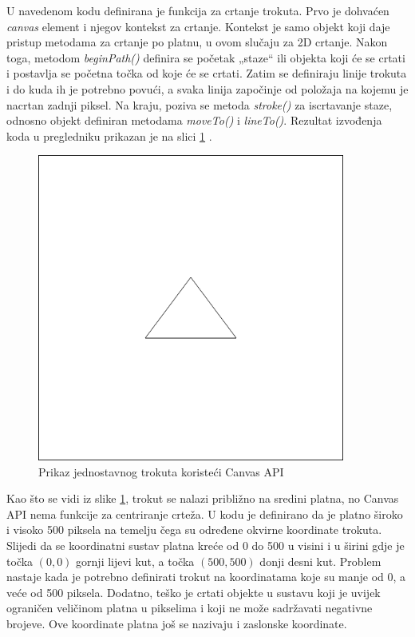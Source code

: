 \documentclass{foi}
\begin{document}
U navedenom kodu definirana je funkcija za crtanje trokuta. Prvo je dohvaćen \textit{canvas} element i njegov kontekst za crtanje. Kontekst je samo objekt koji daje pristup metodama za crtanje po platnu, u ovom slučaju za 2D crtanje. Nakon toga, metodom \textit{beginPath()} definira se početak „staze“ ili objekta koji će se crtati i postavlja se početna točka od koje će se crtati. Zatim se definiraju linije trokuta i do kuda ih je potrebno povući, a svaka linija započinje od položaja na kojemu je nacrtan zadnji piksel. Na kraju, poziva se metoda \textit{stroke()} za iscrtavanje staze, odnosno objekt definiran metodama \textit{moveTo()} i \textit{lineTo()}. Rezultat izvođenja koda u pregledniku prikazan je na slici \ref{fig:OsnovniCanvasTrokut} \parencite{MozzilaDevCanvasAPI}. 
\\
\begin{figure}[H]
    \centering
    \includegraphics[width=0.9\textwidth]{slike/1_OsnovniCanvasTrokut.png}
    \captionsetup{justification=centering}
    \caption{Prikaz jednostavnog trokuta koristeći Canvas API}
\label{fig:OsnovniCanvasTrokut}
\end{figure}

Kao što se vidi iz slike \ref{fig:OsnovniCanvasTrokut}, trokut se nalazi približno na sredini platna, no Canvas API nema funkcije za centriranje crteža. U kodu je definirano da je platno široko i visoko 500 piksela na temelju čega su određene okvirne koordinate trokuta. Slijedi da se koordinatni sustav platna kreće od 0 do 500 u visini i u širini gdje je točka $(0,0)$ gornji lijevi kut, a točka $(500,500)$ donji desni kut. Problem nastaje kada je potrebno definirati trokut na koordinatama koje su manje od 0, a veće od 500 piksela. Dodatno, teško je crtati objekte u sustavu koji je uvijek ograničen veličinom platna u pikselima i koji ne može sadržavati negativne brojeve. Ove koordinate platna još se nazivaju i zaslonske koordinate.
\end{document}
